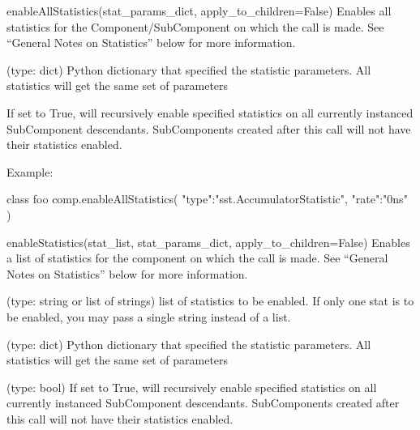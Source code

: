 \begin{functiondoc}{enableAllStatistics(stat_params_dict, apply_to_children=False)}
  { Enables all statistics for the Component/SubComponent on which the
    call is made.  See “General Notes on Statistics” below for more
    information.}

   (type: dict) Python dictionary that
  specified the statistic parameters.  All statistics will get the
  same set of parameters

   If set to True, will recursively enable
  specified statistics on all currently instanced SubComponent
  descendants.  SubComponents created after this call will not have
  their statistics enabled.

  \noreturn

  Example:

  \begin{pycodeexample}{}
    class foo
    comp.enableAllStatistics({
        "type":"sst.AccumulatorStatistic",
        "rate":"0ns"
    })
  \end{pycodeexample}
\end{functiondoc}
  
\begin{functiondoc}{enableStatistics(stat_list, stat_params_dict,
  apply_to_children=False)}{ Enables a list of statistics for the
  component on which the call is made.  See “General Notes on
  Statistics” below for more information.
}

   (type: string or list of strings) list of
  statistics to be enabled.  If only one stat is to be enabled, you
  may pass a single string instead of a list.

   (type: dict) Python dictionary that
  specified the statistic parameters.  All statistics will get the
  same set of parameters

   (type: bool) If set to True, will
  recursively enable specified statistics on all currently instanced
  SubComponent descendants. SubComponents created after this call will
  not have their statistics enabled.

  \noreturn
\end{functiondoc}
  

